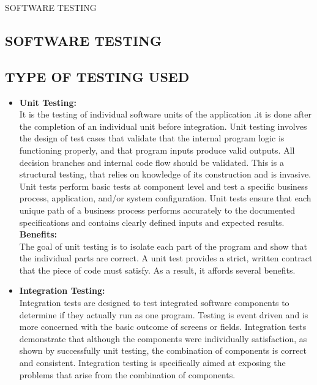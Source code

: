 \documentclass[12pt,a4paper]
{article}
\numberwithin{table}{section}
\begin{document}
{{{{{{{{\begin{minipage}{15cm}
\begin{center}
\begin{Huge}
\vspace{0.5 in}
SOFTWARE TESTING

\end{Huge}

\end{center}
\end{minipage}

\newpage
\begin{center}
\section{SOFTWARE TESTING}
\end{center}
\subsection{TYPE OF TESTING USED}
\begin{itemize}
\item\textbf{Unit Testing:}\\
It is the testing of individual software units of the application .it is done after the completion of an individual unit before integration. Unit testing involves the design of test cases that validate that the internal program logic is functioning properly, and that program inputs produce valid outputs. All decision branches and internal code flow should be validated. This is a structural testing, that relies on knowledge of its construction and is invasive.
Unit tests perform basic tests at component level and test a specific business process, application, and/or system configuration. Unit tests ensure that each unique path of a business process performs accurately to the documented specifications and contains clearly defined inputs and expected results.\\
\textbf{Benefits:}\\
The goal of unit testing is to isolate each part of the program and show that the individual parts are correct. A unit test provides a strict, written contract that the piece of code must satisfy. As a result, it affords several benefits.
\item\textbf{Integration Testing:}\\
Integration tests are designed to test integrated software components to determine if they actually run as one program.  Testing is event driven and is more concerned with the basic outcome of screens or fields. Integration tests demonstrate that although the components were individually satisfaction, as shown by successfully unit testing, the combination of components is correct and consistent. Integration testing is specifically aimed at   exposing the problems that arise from the combination of components.\\

\end{itemize}}}}}}}}}
\end{document}
